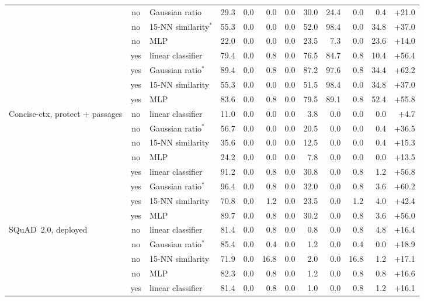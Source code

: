 \documentclass{article}
\theoremstyle{plain}
\theoremstyle{definition}
\theoremstyle{remark}
\begin{document}
\begin{table}[t]
\begin{tabular}{l c l r rr rrr rr r}
 & no & Gaussian ratio & 29.3 & 0.0 & 0.0 & 0.0 & 30.0 & 24.4 & 0.0 & 0.4 & +21.0 \\
 & no & 15-NN similarity$^\ast$ & 55.3 & 0.0 & 0.0 & 0.0 & 52.0 & 98.4 & 0.0 & 34.8 & +37.0 \\
 & no & MLP & 22.0 & 0.0 & 0.0 & 0.0 & 23.5 & 7.3 & 0.0 & 23.6 & +14.0 \\
\cmidrule(lr){2-12}
 & yes & linear classifier & 79.4 & 0.0 & 0.8 & 0.0 & 76.5 & 84.7 & 0.8 & 10.4 & +56.4 \\
 & yes & Gaussian ratio$^\ast$ & 89.4 & 0.0 & 0.8 & 0.0 & 87.2 & 97.6 & 0.8 & 34.4 & +62.2 \\
 & yes & 15-NN similarity & 55.3 & 0.0 & 0.0 & 0.0 & 51.5 & 98.4 & 0.0 & 34.8 & +37.0 \\
 & yes & MLP & 83.6 & 0.0 & 0.8 & 0.0 & 79.5 & 89.1 & 0.8 & 52.4 & +55.8 \\
\midrule
Concise-ctx, protect + passages & no & linear classifier & 11.0 & 0.0 & 0.0 & 0.0 & 3.8 & 0.0 & 0.0 & 0.0 & +4.7 \\
 & no & Gaussian ratio$^\ast$ & 56.7 & 0.0 & 0.0 & 0.0 & 20.5 & 0.0 & 0.0 & 0.4 & +36.5 \\
 & no & 15-NN similarity & 35.6 & 0.0 & 0.0 & 0.0 & 12.5 & 0.0 & 0.0 & 0.4 & +15.3 \\
 & no & MLP & 24.2 & 0.0 & 0.0 & 0.0 & 7.8 & 0.0 & 0.0 & 0.0 & +13.5 \\
\cmidrule(lr){2-12}
 & yes & linear classifier & 91.2 & 0.0 & 0.8 & 0.0 & 30.8 & 0.0 & 0.8 & 1.2 & +56.8 \\
 & yes & Gaussian ratio$^\ast$ & 96.4 & 0.0 & 0.8 & 0.0 & 32.0 & 0.0 & 0.8 & 3.6 & +60.2 \\
 & yes & 15-NN similarity & 70.8 & 0.0 & 1.2 & 0.0 & 23.5 & 0.0 & 1.2 & 4.0 & +42.4 \\
 & yes & MLP & 89.7 & 0.0 & 0.8 & 0.0 & 30.2 & 0.0 & 0.8 & 3.6 & +56.0 \\
\midrule
SQuAD~2.0, deployed & no & linear classifier & 81.4 & 0.0 & 0.8 & 0.0 & 0.8 & 0.0 & 0.8 & 4.8 & +16.4 \\
 & no & Gaussian ratio$^\ast$ & 85.4 & 0.0 & 0.4 & 0.0 & 1.2 & 0.0 & 0.4 & 0.0 & +18.9 \\
 & no & 15-NN similarity & 71.9 & 0.0 & 16.8 & 0.0 & 2.0 & 0.0 & 16.8 & 1.2 & +17.1 \\
 & no & MLP & 82.3 & 0.0 & 0.8 & 0.0 & 1.2 & 0.0 & 0.8 & 0.8 & +16.6 \\
\cmidrule(lr){2-12}
 & yes & linear classifier & 81.4 & 0.0 & 0.8 & 0.0 & 1.0 & 0.0 & 0.8 & 1.2 & +16.1 \\

\end{tabular}
\end{table}
\end{document}
